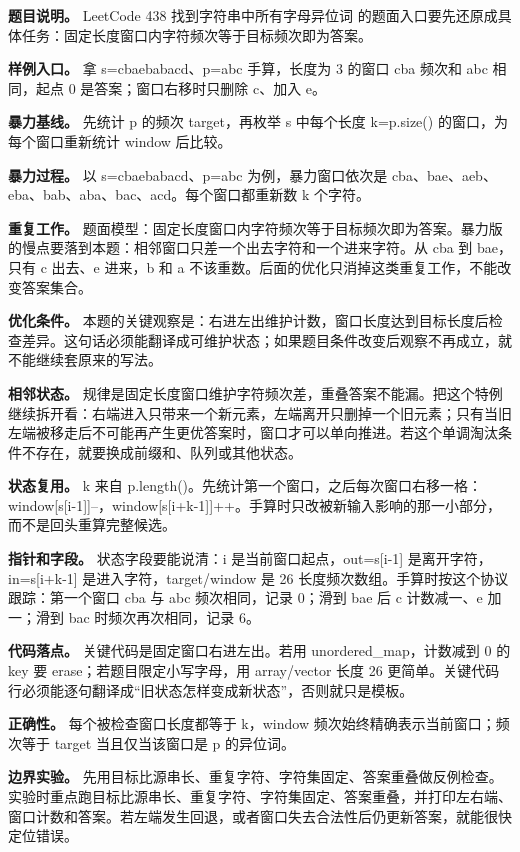 \textbf{题目说明。} LeetCode 438 找到字符串中所有字母异位词 的题面入口要先还原成具体任务：固定长度窗口内字符频次等于目标频次即为答案。

\textbf{样例入口。} 拿 s=cbaebabacd、p=abc 手算，长度为 3 的窗口 cba 频次和 abc 相同，起点 0 是答案；窗口右移时只删除 c、加入 e。

\textbf{暴力基线。} 先统计 p 的频次 target，再枚举 s 中每个长度 k=p.size() 的窗口，为每个窗口重新统计 window 后比较。

\textbf{暴力过程。} 以 s=cbaebabacd、p=abc 为例，暴力窗口依次是 cba、bae、aeb、eba、bab、aba、bac、acd。每个窗口都重新数 k 个字符。

\textbf{重复工作。} 题面模型：固定长度窗口内字符频次等于目标频次即为答案。暴力版的慢点要落到本题：相邻窗口只差一个出去字符和一个进来字符。从 cba 到 bae，只有 c 出去、e 进来，b 和 a 不该重数。后面的优化只消掉这类重复工作，不能改变答案集合。

\textbf{优化条件。} 本题的关键观察是：右进左出维护计数，窗口长度达到目标长度后检查差异。这句话必须能翻译成可维护状态；如果题目条件改变后观察不再成立，就不能继续套原来的写法。

\textbf{相邻状态。} 规律是固定长度窗口维护字符频次差，重叠答案不能漏。把这个特例继续拆开看：右端进入只带来一个新元素，左端离开只删掉一个旧元素；只有当旧左端被移走后不可能再产生更优答案时，窗口才可以单向推进。若这个单调淘汰条件不存在，就要换成前缀和、队列或其他状态。

\textbf{状态复用。} k 来自 p.length()。先统计第一个窗口，之后每次窗口右移一格：window[s[i-1]]--，window[s[i+k-1]]++。手算时只改被新输入影响的那一小部分，而不是回头重算完整候选。

\textbf{指针和字段。} 状态字段要能说清：i 是当前窗口起点，out=s[i-1] 是离开字符，in=s[i+k-1] 是进入字符，target/window 是 26 长度频次数组。手算时按这个协议跟踪：第一个窗口 cba 与 abc 频次相同，记录 0；滑到 bae 后 c 计数减一、e 加一；滑到 bac 时频次再次相同，记录 6。

\textbf{代码落点。} 关键代码是固定窗口右进左出。若用 unordered\_map，计数减到 0 的 key 要 erase；若题目限定小写字母，用 array/vector 长度 26 更简单。关键代码行必须能逐句翻译成“旧状态怎样变成新状态”，否则就只是模板。

\textbf{正确性。} 每个被检查窗口长度都等于 k，window 频次始终精确表示当前窗口；频次等于 target 当且仅当该窗口是 p 的异位词。

\textbf{边界实验。} 先用目标比源串长、重复字符、字符集固定、答案重叠做反例检查。实验时重点跑目标比源串长、重复字符、字符集固定、答案重叠，并打印左右端、窗口计数和答案。若左端发生回退，或者窗口失去合法性后仍更新答案，就能很快定位错误。

